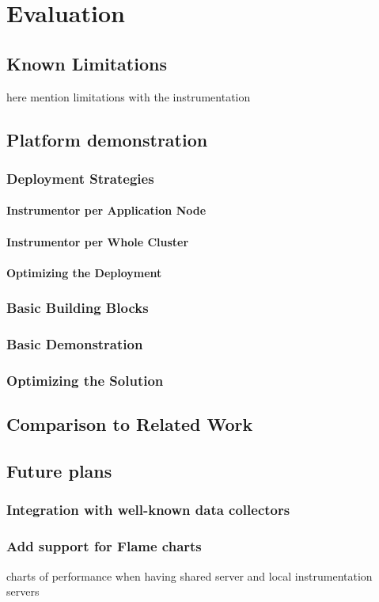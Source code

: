 \chapter{Evaluation}
\label{chap:evaluation}
\section{Known Limitations}
here mention limitations with the instrumentation


\section{Platform demonstration}
\subsection{Deployment Strategies}
\subsubsection{Instrumentor per Application Node}
\subsubsection{Instrumentor per Whole Cluster}
\subsubsection{Optimizing the Deployment}
\subsection{Basic Building Blocks}
\subsection{Basic Demonstration}
\subsection{Optimizing the Solution}
\section{Comparison to Related Work}
\section{Future plans}
\subsection{Integration with well-known data collectors}
\subsection{Add support for Flame charts}
charts of performance when having shared server and local instrumentation servers